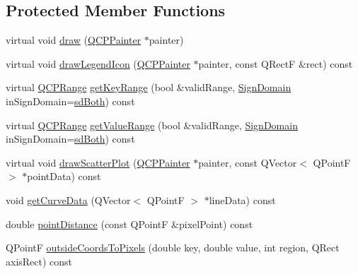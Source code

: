 \subsection*{Protected Member Functions}
\begin{DoxyCompactItemize}
\item 
virtual void \hyperlink{class_q_c_p_curve_a2361302d2fc6ec669849bd3bca00c4b2}{draw} (\hyperlink{class_q_c_p_painter}{Q\-C\-P\-Painter} $\ast$painter)
\item 
virtual void \hyperlink{class_q_c_p_curve_aaee24451e0044d1debfa1fee92c58d7b}{draw\-Legend\-Icon} (\hyperlink{class_q_c_p_painter}{Q\-C\-P\-Painter} $\ast$painter, const Q\-Rect\-F \&rect) const 
\item 
virtual \hyperlink{class_q_c_p_range}{Q\-C\-P\-Range} \hyperlink{class_q_c_p_curve_aed062a72e98372480a683cdd201b5612}{get\-Key\-Range} (bool \&valid\-Range, \hyperlink{class_q_c_p_abstract_plottable_a661743478a1d3c09d28ec2711d7653d8}{Sign\-Domain} in\-Sign\-Domain=\hyperlink{class_q_c_p_abstract_plottable_a661743478a1d3c09d28ec2711d7653d8a082b98cfb91a7363a3b5cd17b0c1cd60}{sd\-Both}) const 
\item 
virtual \hyperlink{class_q_c_p_range}{Q\-C\-P\-Range} \hyperlink{class_q_c_p_curve_a5e788d369793e0179c5a46fce3bcb0fb}{get\-Value\-Range} (bool \&valid\-Range, \hyperlink{class_q_c_p_abstract_plottable_a661743478a1d3c09d28ec2711d7653d8}{Sign\-Domain} in\-Sign\-Domain=\hyperlink{class_q_c_p_abstract_plottable_a661743478a1d3c09d28ec2711d7653d8a082b98cfb91a7363a3b5cd17b0c1cd60}{sd\-Both}) const 
\item 
virtual void \hyperlink{class_q_c_p_curve_a45593f30b81beec4b6130b6b53306087}{draw\-Scatter\-Plot} (\hyperlink{class_q_c_p_painter}{Q\-C\-P\-Painter} $\ast$painter, const Q\-Vector$<$ Q\-Point\-F $>$ $\ast$point\-Data) const 
\item 
void \hyperlink{class_q_c_p_curve_afa895f8ba9ae34fea6ecea295fd7b1e5}{get\-Curve\-Data} (Q\-Vector$<$ Q\-Point\-F $>$ $\ast$line\-Data) const 
\item 
double \hyperlink{class_q_c_p_curve_acd7a68c6f268ce1ab845eaf69fc2c6a6}{point\-Distance} (const Q\-Point\-F \&pixel\-Point) const 
\item 
Q\-Point\-F \hyperlink{class_q_c_p_curve_a3a4d067f833d51be6eb67f0aa1e2c387}{outside\-Coords\-To\-Pixels} (double key, double value, int region, Q\-Rect axis\-Rect) const 
\end{DoxyCompactItemize}
